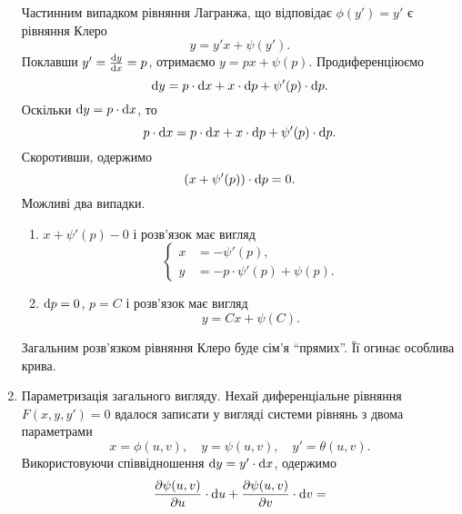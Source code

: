 \begin{enumerate}
	Частинним випадком рівняння Лагранжа, що відповідає $\phi(y') = y'$ є рівняння Клеро
 	\begin{equation*}
 		y = y' x + \psi(y').
 	\end{equation*}
	Поклавши $y' = \frac{\mathop{}\!\mathrm{d} y}{\mathop{}\!\mathrm{d} x} = p$, отримаємо $y = p x + \psi(p)$. Продиференціюємо 
	\begin{equation*}
		\mathop{}\!\mathrm{d} y = p \cdot \mathop{}\!\mathrm{d} x + x \cdot \mathop{}\!\mathrm{d} p + \psi'(p) \cdot \mathop{}\!\mathrm{d} p.
	\end{equation*}
	Оскільки $\mathop{}\!\mathrm{d} y = p \cdot \mathop{}\!\mathrm{d} x$, то
	\begin{equation*}
		p \cdot \mathop{}\!\mathrm{d} x = p \cdot \mathop{}\!\mathrm{d} x + x \cdot \mathop{}\!\mathrm{d} p + \psi'(p) \cdot \mathop{}\!\mathrm{d} p.
	\end{equation*}
	Скоротивши, одержимо
	\begin{equation*}
		(x + \psi'(p)) \cdot \mathop{}\!\mathrm{d} p = 0.
	\end{equation*}
	Можливі два випадки.
	\begin{enumerate}
		\item $x + \psi'(p) - 0$ і розв’язок має вигляд
		\begin{equation*}
			\left\{\begin{aligned}
				x &= - \psi'(p), \\
				y &= -p \cdot \psi'(p) + \psi(p).
			\end{aligned}\right.
		\end{equation*}
		\item $\mathop{}\!\mathrm{d} p = 0$, $p = C$ і розв’язок має вигляд
		\begin{equation*}
			y = C x + \psi(C).
		\end{equation*}
	\end{enumerate}
	Загальним розв’язком рівняння Клеро буде сім'я ``прямих''. Її огинає особлива крива.
	\item Параметризація загального вигляду. Нехай диференціальне рівняння $F(x, y, y') = 0$ вдалося записати у вигляді системи рівнянь з двома параметрами
	\begin{equation*}
		x = \phi(u, v), \quad y = \psi(u, v), \quad y' = \theta(u, v).	
	\end{equation*}
	Використовуючи співвідношення $\mathop{}\!\mathrm{d} y = y' \cdot \mathop{}\!\mathrm{d} x$, одержимо
	\begin{multline*}
		\frac{\partial \psi(u,v)}{\partial u} \cdot \diff u + \frac{\partial \psi(u, v)}{\partial v} \cdot \diff v = \\

\end{multline*}
\end{enumerate}
